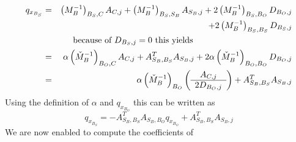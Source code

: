 \documentclass[a4paper]{article}
\begin{document}
\begin{eqnarray}
q_{x_{B_{S}}}
&=&
\left(M_{B}^{-1}\right)_{B_{S},C}A_{C,j}
+\left(M_{B}^{-1}\right)_{B_{S}, S_{B}}A_{S_{B}, j}
+2\left(M_{B}^{-1}\right)_{B_{S}, B_{O}}D_{B_{O}, j}
\nonumber \\
&&
+2\left(M_{B}^{-1}\right)_{B_{S}, B_{S}}D_{B_{S}, j}
\nonumber \\
&&\begin{minipage}{9cm}
because of $D_{B_{S},j}=0$ this yields
\end{minipage}
\nonumber \\
&=&
\alpha\left(\check{M}_{B}^{-1}\right)_{B_{O}, C}A_{C, j}
+A_{S_{B}, B_{S}}^{T}A_{S_{B}, j}
+2\alpha\left(\check{M}_{B}^{-1}\right)_{B_{O}, B_{O}}D_{B_{O},j}
\nonumber \\
&=&
\alpha\left(\check{M}_{B}^{-1}\right)_{B_{O}}
\left(\begin{array}{c}
        A_{C,j} \\
	\hline
	2D_{B_{O}, j}
       \end{array}
\right)
+A_{S_{B}, B_{S}}^{T}A_{S_{B}, j}
\nonumber
\end{eqnarray}
Using the definition of $\alpha$ and $q_{x_{B_{O}}}$ this can be written as
\begin{equation}
q_{x_{B_{S}}}=
-A_{S_{B}, B_{S}}^{T}A_{S_{B}, B_{O}}q_{x_{B_{O}}}
+A_{S_{B}, B_{S}}^{T}A_{S_{B}, j}
\end{equation}
We are now enabled to compute the coefficients of
\end{document}

